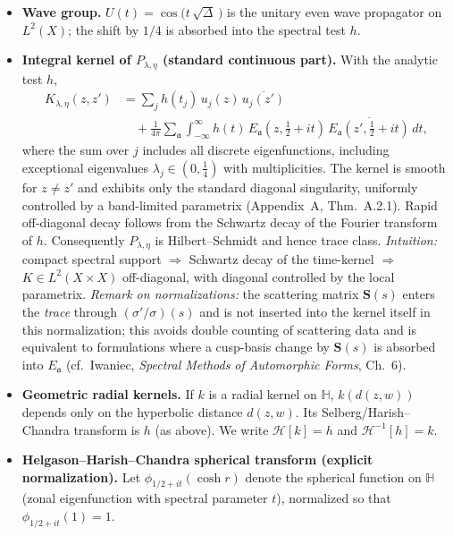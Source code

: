 \begin{itemize}
  \item \textbf{Wave group.} $U(t)=\cos\!\big(t\,\sqrt{\Delta}\,\big)$ is the unitary even wave propagator on $L^2(X)$; the shift by $1/4$ is absorbed into the spectral test $h$.
  \item \textbf{Integral kernel of $P_{\lambda,\eta}$ (standard continuous part).} With the analytic test $h$,
        \begin{equation*}
        \begin{aligned}
           K_{\lambda,\eta}(z,z') &= \sum_{j} h(t_j)\,u_j(z)\,\overline{u_j(z')}
           \\
           &\quad + \frac{1}{4\pi}\sum_{\mathfrak{a}}\int_{-\infty}^{\infty}
           h(t)\,E_\mathfrak{a}(z,\tfrac12+it)\,\overline{E_\mathfrak{a}(z',\tfrac12+it)}\,dt,
        \end{aligned}
        \end{equation*}
        where the sum over $j$ includes all discrete eigenfunctions, including exceptional eigenvalues $\lambda_j\in(0,\tfrac14)$ with multiplicities.
        The kernel is smooth for $z\neq z'$ and exhibits only the standard diagonal singularity, uniformly controlled by a band-limited parametrix (Appendix~A, Thm.~A.2.1).
        Rapid off-diagonal decay follows from the Schwartz decay of the Fourier transform of $h$. Consequently $P_{\lambda,\eta}$ is Hilbert--Schmidt and hence trace class.
        \emph{Intuition:} compact spectral support $\Rightarrow$ Schwartz decay of the time-kernel $\Rightarrow$ $K\in L^2(X\times X)$ off-diagonal, with diagonal controlled by the local parametrix.
        \emph{Remark on normalizations:} the scattering matrix $\mathbf{S}(s)$ enters the \emph{trace} through $(\sigma'/\sigma)(s)$ and is not inserted into the kernel itself in this normalization; this avoids double counting of scattering data and is equivalent to formulations where a cusp-basis change by $\mathbf{S}(s)$ is absorbed into $E_\mathfrak{a}$ (cf.\ Iwaniec, \emph{Spectral Methods of Automorphic Forms}, Ch.~6).
  \item \textbf{Geometric radial kernels.} If $k$ is a radial kernel on $\mathbb{H}$, $k(d(z,w))$ depends only on the hyperbolic distance $d(z,w)$.
        Its Selberg/Harish--Chandra transform is $h$ (as above). We write $\mathcal{H}[k]=h$ and $\mathcal{H}^{-1}[h]=k$.
  \item \textbf{Helgason--Harish--Chandra spherical transform (explicit normalization).}
        Let $\phi_{1/2+it}(\cosh r)$ denote the spherical function on $\mathbb{H}$ (zonal eigenfunction with spectral parameter $t$), normalized so that $\phi_{1/2+it}(1)=1$.

\end{itemize}
